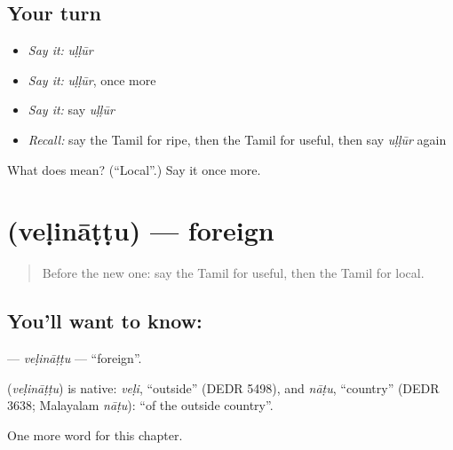 \subsection*{Your turn}
\begin{itemize}
\raggedright
  \item \emph{Say it:} \emph{uḷḷūr}
  \item \emph{Say it:} \emph{uḷḷūr}, once more
  \item \emph{Say it:} say \emph{uḷḷūr}
  \item \emph{Recall:} say the Tamil for ripe, then the Tamil for useful, then say \emph{uḷḷūr} again
\end{itemize}

\begin{tcolorbox}[breakable,colback=teal!4,colframe=teal!35!black,title={Before you move on}]
What does  mean? (\textquotedblleft{}Local\textquotedblright{}.) Say it once more.
\end{tcolorbox}
\section[\texorpdfstring{\ta{வெளிநாட்டு} (veḷināṭṭu)}{வெளிநாட்டு (veḷināṭṭu)}]{ (veḷināṭṭu) — foreign}

\label{lesson:TA-C179-velinattu}



\begin{quote}
Before the new one: say the Tamil for useful, then the Tamil for local.
\end{quote}

\subsection*{You'll want to know: }
\textbf{} — \emph{veḷināṭṭu} — \textquotedblleft{}foreign\textquotedblright{}.

\begin{cousinweb}
\textbf{} (\emph{veḷināṭṭu}) is native: \emph{veḷi}, \textquotedblleft{}outside\textquotedblright{} (DEDR 5498), and \emph{nāṭu}, \textquotedblleft{}country\textquotedblright{} (DEDR 3638; Malayalam \emph{nāṭu}): \textquotedblleft{}of the outside country\textquotedblright{}.
\end{cousinweb}

\begin{grammarlens}[title={What you've built}]
One more word for this chapter.
\end{grammarlens}

